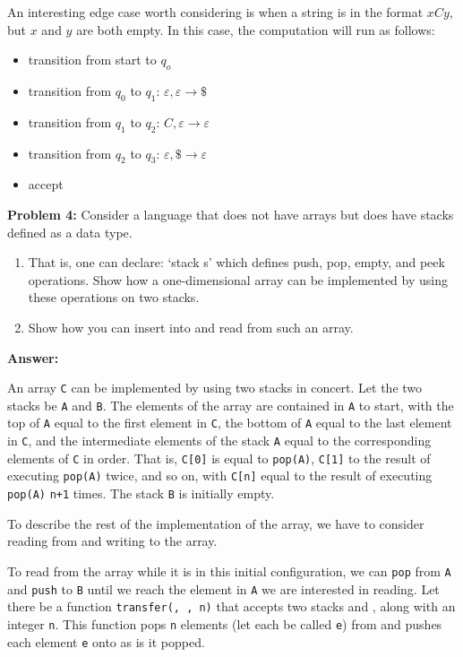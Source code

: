 \documentclass[12pt,letterpaper,final]{report}
\begin{document}
An interesting edge case worth considering is when a string is in the format $xCy$, but $x$ and $y$ are both empty. In this case, the computation will run as follows:

\begin{itemize}
  \item transition from start to $q_o$
  \item transition from $q_0$ to $q_1$: $\varepsilon, \varepsilon \to \$$
  \item transition from $q_1$ to $q_2$: $C, \varepsilon \to \varepsilon$
  \item transition from $q_2$ to $q_3$: $\varepsilon, \$ \to \varepsilon$
  \item accept
\end{itemize}

\noindent\textbf{Problem 4:}
Consider a language that does not have arrays but does have stacks defined as a data type.
\begin{enumerate}
  \item That is, one can declare: `stack s' which defines push, pop, empty, and peek operations. Show how a one-dimensional array can be implemented by using these operations on two stacks.
  \item Show how you can insert into and read from such an array.
\end{enumerate}

\noindent\textbf{Answer:}

An array \texttt{C} can be implemented by using two stacks in concert. Let the two stacks be \texttt{A} and \texttt{B}. The elements of the array are contained in \texttt{A} to start, with the top of \texttt{A} equal to the first element in \texttt{C}, the bottom of \texttt{A} equal to the last element in \texttt{C}, and the intermediate elements of the stack \texttt{A} equal to the corresponding elements of \texttt{C} in order. That is, \texttt{C[0]} is equal to \texttt{pop(A)}, \texttt{C[1]} to the result of executing \texttt{pop(A)} twice, and so on, with \texttt{C[n]} equal to the result of executing \texttt{pop(A)} \texttt{n+1} times. The stack \texttt{B} is initially empty.

To describe the rest of the implementation of the array, we have to consider reading from and writing to the array.

To read from the array while it is in this initial configuration, we can \texttt{pop} from \texttt{A} and \texttt{push} to \texttt{B} until we reach the element in \texttt{A} we are interested in reading. Let there be a function \texttt{transfer(\alpha, \beta, n)} that accepts two stacks \texttt{\alpha} and \texttt{\beta}, along with an integer \texttt{n}. This function pops \texttt{n} elements (let each be called \texttt{e}) from \texttt{\alpha} and pushes each element \texttt{e} onto \texttt{\beta} as is it popped.
\end{document}
